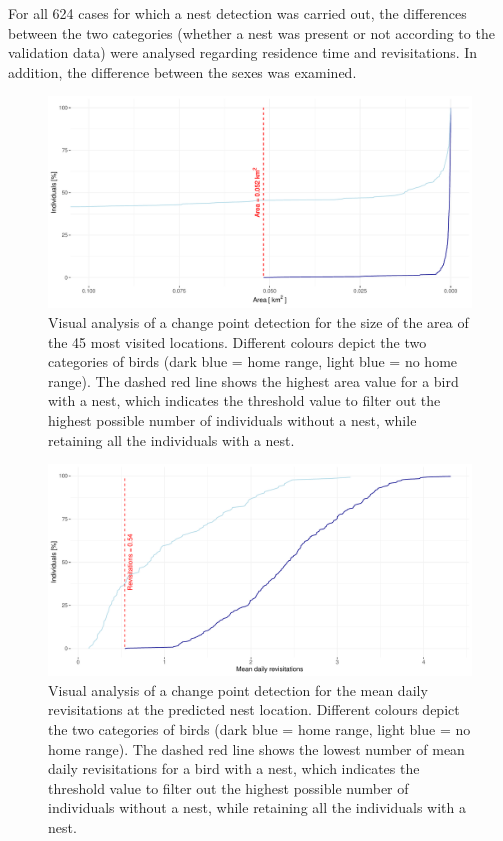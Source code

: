 For all 624 cases for which a nest detection was carried out, the differences between the two categories (whether a nest was present or not according to the validation data) were analysed regarding residence time and revisitations. In addition, the difference between the sexes was examined.

\begin{figure}[H]
\centering
\includegraphics[width=1\textwidth]{figures/methods/01_area_45_most_visited.pdf}
\caption[Change point detection for the size of the area of the 45 most visited locations]{Visual analysis of a change point detection for the size of the area of the 45 most visited locations. Different colours depict the two categories of birds (dark blue = home range, light blue = no home range). The dashed red line shows the highest area value for a bird with a nest, which indicates the threshold value to filter out the highest possible number of individuals without a nest, while retaining all the individuals with a nest.}
\label{figure:nest_area_45}
\end{figure}

\begin{figure}[H]
\centering
\includegraphics[width=1\textwidth]{figures/methods/06_revisits.pdf}
\caption[Change point detection for the mean daily revisitations at the predicted nest location]{Visual analysis of a change point detection for the mean daily revisitations at the predicted nest location. Different colours depict the two categories of birds (dark blue = home range, light blue = no home range). The dashed red line shows the lowest number of mean daily revisitations for a bird with a nest, which indicates the threshold value to filter out the highest possible number of individuals without a nest, while retaining all the individuals with a nest.}
\label{figure:revisits_cpd}
\end{figure}

